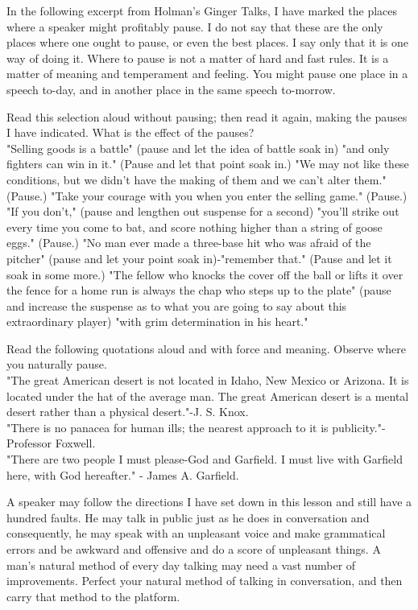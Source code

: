 \documentclass[10pt]{article}
\begin{document}
In the following excerpt from Holman's Ginger Talks, I have marked the places where a speaker might profitably pause. I do not say that these are the only places where one ought to pause, or even the best places. I say only that it is one way of doing it. Where to pause is not a matter of hard and fast rules. It is a matter of meaning and temperament and feeling. You might pause one place in a speech to-day, and in another place in the same speech to-morrow.

Read this selection aloud without pausing; then read it again, making the pauses I have indicated. What is the effect of the pauses?\\
"Selling goods is a battle" (pause and let the idea of battle soak in) "and only fighters can win in it." (Pause and let that point soak in.) "We may not like these conditions, but we didn't have the making of them and we can't alter them." (Pause.) "Take your courage with you when you enter the selling game." (Pause.) "If you don't," (pause and lengthen out suspense for a second) "you'll strike out every time you come to bat, and score nothing higher than a string of goose eggs." (Pause.) "No man ever made a three-base hit who was afraid of the pitcher" (pause and let your point soak in)-"remember that." (Pause and let it soak in some more.) "The fellow who knocks the cover off the ball or lifts it over the fence for a home run is always the chap who steps up to the plate" (pause and increase the suspense as to what you are going to say about this extraordinary player) "with grim determination in his heart."

Read the following quotations aloud and with force and meaning. Observe where you naturally pause.\\
"The great American desert is not located in Idaho, New Mexico or Arizona. It is located under the hat of the average man. The great American desert is a mental desert rather than a physical desert."-J. S. Knox.\\
"There is no panacea for human ills; the nearest approach to it is publicity."-Professor Foxwell.\\
"There are two people I must please-God and Garfield. I must live with Garfield here, with God hereafter." - James A. Garfield.

A speaker may follow the directions I have set down in this lesson and still have a hundred faults. He may talk in public just as he does in conversation and consequently, he may speak with an unpleasant voice and make grammatical errors and be awkward and offensive and do a score of unpleasant things. A man's natural method of every day talking may need a vast number of improvements. Perfect your natural method of talking in conversation, and then carry that method to the platform.
\end{document}
